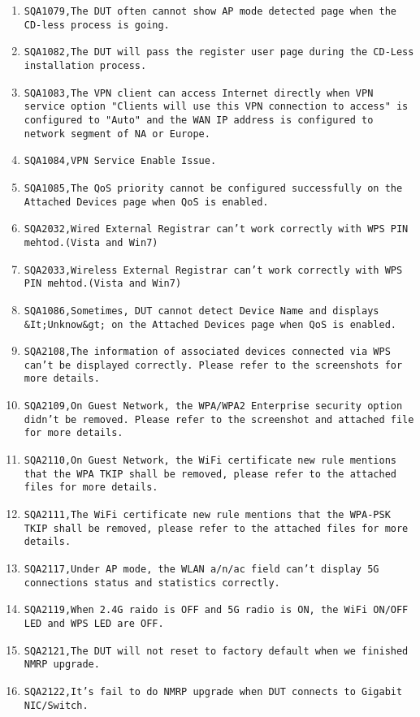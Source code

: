 \documentclass[12pt]{report}
\begin{document}
\begin{itemize}
\begin{enumerate}
		\item \texttt{SQA1079,The DUT often cannot show AP mode detected page when the CD-less process is going.}
		\item \texttt{SQA1082,The DUT will pass the register user page during the CD-Less installation process. }
		\item \texttt{SQA1083,The VPN client can access Internet directly when VPN service option "Clients will use this VPN connection to access" is configured to "Auto" and the WAN IP address is configured to network segment of NA or Europe.}
		\item \texttt{SQA1084,VPN Service Enable Issue.}
		\item \texttt{SQA1085,The QoS priority cannot be configured successfully on the Attached Devices page when QoS is enabled.}
		\item \texttt{SQA2032,Wired External Registrar can't work correctly with WPS PIN mehtod.(Vista and Win7)}
		\item \texttt{SQA2033,Wireless External Registrar can't work correctly with WPS PIN mehtod.(Vista and Win7)}
		\item \texttt{SQA1086,Sometimes, DUT cannot detect Device Name and displays \&It;Unknow\&gt; on the Attached Devices page when QoS is enabled.}
		\item \texttt{SQA2108,The information of associated devices connected via WPS can't be displayed correctly. Please refer to the screenshots for more details.}
		\item \texttt{SQA2109,On Guest Network, the WPA/WPA2 Enterprise security option didn't be removed. Please refer to the screenshot and attached file for more details.}
		\item \texttt{SQA2110,On Guest Network, the WiFi certificate new rule mentions that the WPA TKIP shall be removed, please refer to the attached files for more details.}
		\item \texttt{SQA2111,The WiFi certificate new rule mentions that the WPA-PSK TKIP shall be removed, please refer to the attached files for more details.}
		\item \texttt{SQA2117,Under AP mode, the WLAN a/n/ac field can't display 5G connections status and statistics correctly.}
		\item \texttt{SQA2119,When 2.4G raido is OFF and 5G radio is ON, the WiFi ON/OFF LED and WPS LED are OFF.}
		\item \texttt{SQA2121,The DUT will not reset to factory default when we finished NMRP upgrade.}
		\item \texttt{SQA2122,It's fail to do NMRP upgrade when DUT connects to Gigabit NIC/Switch.}

\end{enumerate}
\end{itemize}
\end{document}
